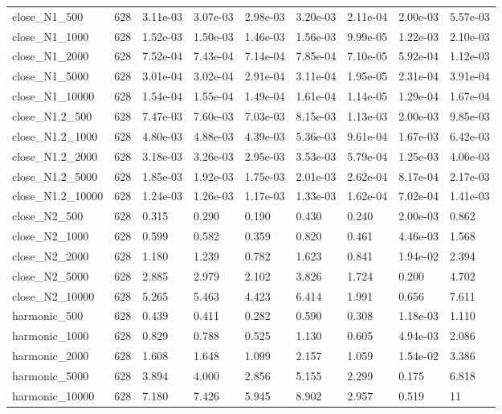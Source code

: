 \begin{tabular}{lrlllllll}
close\_N1\_500 & 628 & 3.11e-03 & 3.07e-03 & 2.98e-03 & 3.20e-03 & 2.11e-04 & 2.00e-03 & 5.57e-03 \\
close\_N1\_1000 & 628 & 1.52e-03 & 1.50e-03 & 1.46e-03 & 1.56e-03 & 9.99e-05 & 1.22e-03 & 2.10e-03 \\
close\_N1\_2000 & 628 & 7.52e-04 & 7.43e-04 & 7.14e-04 & 7.85e-04 & 7.10e-05 & 5.92e-04 & 1.12e-03 \\
close\_N1\_5000 & 628 & 3.01e-04 & 3.02e-04 & 2.91e-04 & 3.11e-04 & 1.95e-05 & 2.31e-04 & 3.91e-04 \\
close\_N1\_10000 & 628 & 1.54e-04 & 1.55e-04 & 1.49e-04 & 1.61e-04 & 1.14e-05 & 1.29e-04 & 1.67e-04 \\
close\_N1.2\_500 & 628 & 7.47e-03 & 7.60e-03 & 7.03e-03 & 8.15e-03 & 1.13e-03 & 2.00e-03 & 9.85e-03 \\
close\_N1.2\_1000 & 628 & 4.80e-03 & 4.88e-03 & 4.39e-03 & 5.36e-03 & 9.61e-04 & 1.67e-03 & 6.42e-03 \\
close\_N1.2\_2000 & 628 & 3.18e-03 & 3.26e-03 & 2.95e-03 & 3.53e-03 & 5.79e-04 & 1.25e-03 & 4.06e-03 \\
close\_N1.2\_5000 & 628 & 1.85e-03 & 1.92e-03 & 1.75e-03 & 2.01e-03 & 2.62e-04 & 8.17e-04 & 2.17e-03 \\
close\_N1.2\_10000 & 628 & 1.24e-03 & 1.26e-03 & 1.17e-03 & 1.33e-03 & 1.62e-04 & 7.02e-04 & 1.41e-03 \\
close\_N2\_500 & 628 & 0.315 & 0.290 & 0.190 & 0.430 & 0.240 & 2.00e-03 & 0.862 \\
close\_N2\_1000 & 628 & 0.599 & 0.582 & 0.359 & 0.820 & 0.461 & 4.46e-03 & 1.568 \\
close\_N2\_2000 & 628 & 1.180 & 1.239 & 0.782 & 1.623 & 0.841 & 1.94e-02 & 2.394 \\
close\_N2\_5000 & 628 & 2.885 & 2.979 & 2.102 & 3.826 & 1.724 & 0.200 & 4.702 \\
close\_N2\_10000 & 628 & 5.265 & 5.463 & 4.423 & 6.414 & 1.991 & 0.656 & 7.611 \\
harmonic\_500 & 628 & 0.439 & 0.411 & 0.282 & 0.590 & 0.308 & 1.18e-03 & 1.110 \\
harmonic\_1000 & 628 & 0.829 & 0.788 & 0.525 & 1.130 & 0.605 & 4.94e-03 & 2.086 \\
harmonic\_2000 & 628 & 1.608 & 1.648 & 1.099 & 2.157 & 1.059 & 1.54e-02 & 3.386 \\
harmonic\_5000 & 628 & 3.894 & 4.000 & 2.856 & 5.155 & 2.299 & 0.175 & 6.818 \\
harmonic\_10000 & 628 & 7.180 & 7.426 & 5.945 & 8.902 & 2.957 & 0.519 & 11 \\

\end{tabular}
